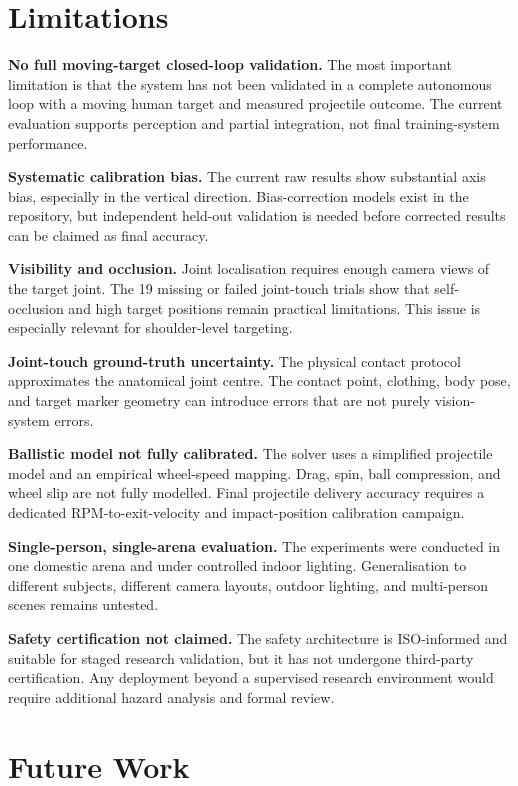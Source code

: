 \section{Limitations}

\textbf{No full moving-target closed-loop validation.} The most important limitation is that the system has not been validated in a complete autonomous loop with a moving human target and measured projectile outcome. The current evaluation supports perception and partial integration, not final training-system performance.

\textbf{Systematic calibration bias.} The current raw results show substantial axis bias, especially in the vertical direction. Bias-correction models exist in the repository, but independent held-out validation is needed before corrected results can be claimed as final accuracy.

\textbf{Visibility and occlusion.} Joint localisation requires enough camera views of the target joint. The 19 missing or failed joint-touch trials show that self-occlusion and high target positions remain practical limitations. This issue is especially relevant for shoulder-level targeting.

\textbf{Joint-touch ground-truth uncertainty.} The physical contact protocol approximates the anatomical joint centre. The contact point, clothing, body pose, and target marker geometry can introduce errors that are not purely vision-system errors.

\textbf{Ballistic model not fully calibrated.} The solver uses a simplified projectile model and an empirical wheel-speed mapping. Drag, spin, ball compression, and wheel slip are not fully modelled. Final projectile delivery accuracy requires a dedicated RPM-to-exit-velocity and impact-position calibration campaign.

\textbf{Single-person, single-arena evaluation.} The experiments were conducted in one domestic arena and under controlled indoor lighting. Generalisation to different subjects, different camera layouts, outdoor lighting, and multi-person scenes remains untested.

\textbf{Safety certification not claimed.} The safety architecture is ISO-informed and suitable for staged research validation, but it has not undergone third-party certification. Any deployment beyond a supervised research environment would require additional hazard analysis and formal review.

\section{Future Work}

